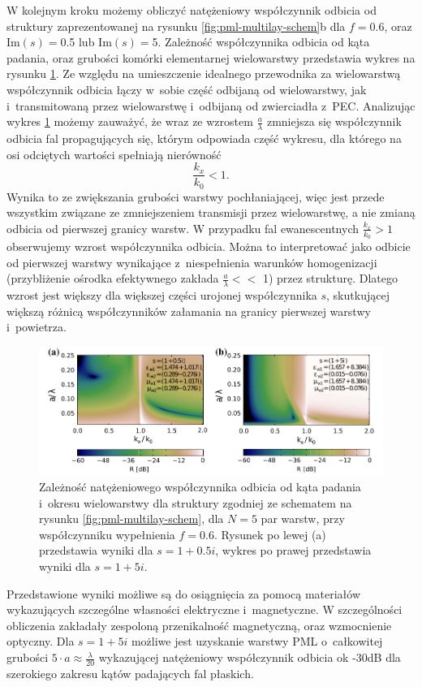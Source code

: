 W kolejnym kroku możemy obliczyć natężeniowy współczynnik odbicia od struktury zaprezentowanej na rysunku \ref{fig:pml-multilay-schem}b dla $f=0.6$, oraz $\textrm{Im}(s)=$0.5 lub $\textrm{Im}(s)=$5. Zależność współczynnika odbicia od kąta padania, oraz grubości komórki elementarnej wielowarstwy przedstawia wykres na rysunku \ref{fig:oqe3}. Ze względu na umieszczenie idealnego przewodnika za wielowarstwą współczynnik odbicia łączy w~sobie część odbijaną od wielowarstwy, jak i~transmitowaną przez wielowarstwę i~odbijaną od zwierciadła z~PEC. Analizując wykres \ref{fig:oqe3} możemy zauważyć, że wraz ze wzrostem $\frac{a}{\lambda}$ zmniejsza się współczynnik odbicia fal propagujących się, którym odpowiada część wykresu, dla którego na osi odciętych wartości spełniają nierówność
\[ 
\frac{k_x}{k_0}<1.
\] Wynika to ze zwiększania grubości warstwy pochłaniającej, więc jest przede wszystkim związane ze zmniejszeniem transmisji przez wielowarstwę, a nie zmianą odbicia od pierwszej granicy warstw. W przypadku fal ewanescentnych $\frac{k_x}{k_0}>1$ obserwujemy wzrost współczynnika odbicia. Można to interpretować jako odbicie od pierwszej warstwy wynikające z~niespełnienia warunków homogenizacji (przybliżenie ośrodka efektywnego zakłada $\frac{a}{\lambda} <<$ 1) przez strukturę. Dlatego wzrost jest większy dla większej części urojonej współczynnika $s$, skutkującej większą różnicą współczynników załamania na granicy pierwszej warstwy i~powietrza.

\begin{figure}[tb]
	\includegraphics[width=\textwidth]{images/pml/fig3.png}
	\caption{Zależność natężeniowego współczynnika odbicia od kąta padania i~okresu wielowarstwy dla struktury zgodniej ze schematem na rysunku \ref{fig:pml-multilay-schem}, dla $N=5$ par warstw, przy współczynniku wypełnienia $f=0.6$. Rysunek po lewej (a) przedstawia wyniki dla $s=1+0.5i$, wykres po prawej przedstawia wyniki dla $s=1+5i$.}
	\label{fig:oqe3}
\end{figure}

Przedstawione wyniki możliwe są do osiągnięcia za pomocą materiałów wykazujących szczególne własności elektryczne i~magnetyczne. W szczególności obliczenia zakładały zespoloną przenikalność magnetyczną, oraz wzmocnienie optyczny. Dla $s=1+5i$ możliwe jest uzyskanie warstwy PML o~całkowitej grubości $5\cdot a \approx \frac{\lambda}{20}$ wykazującej natężeniowy współczynnik odbicia ok -30dB dla szerokiego zakresu kątów padających fal płaskich.

